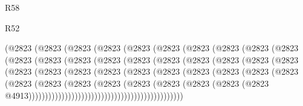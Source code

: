 \begin{lexlean}{R58}
\begin{lexlean}{R52}
\begin{coremodule}
{{{{{{{{{{{{{{{{{{{{{{{{{{{{{{{{{{{{{{{{{{{{{{{{{{{{{{{{{{{{{{{{{{{{{{{{{{{{{{{{{{{{{{{{{{{{{{{{{{{{{{{{{{{{{{{{{{{{{{{{{{{{{{{{{{{{{{{{{{{{{{{{{{{{{{{{{{{{{{{{{{{{{{{{{{{{{{{{{{{{{{{{{{{{{{{{{{{{{{                    (@2823
                      (@2823
                        (@2823
                          (@2823
                            (@2823
                              (@2823
                                (@2823
                                  (@2823
                                    (@2823
                                      (@2823
                                        (@2823
                                          (@2823
                                            (@2823
                                              (@2823
                                                (@2823
                                                  (@2823
                                                    (@2823
                                                      (@2823
                                                        (@2823
                                                          (@2823
                                                            (@2823
                                                              (@2823
                                                                (@2823
                                                                  (@2823
                                                                    (@2823
                                                                      (@2823
                                                                        (@2823
                                                                          (@2823
                                                                            (@2823
                                                                              (@2823
                                                                                (@2823
                                                                                  (@2823
                                                                                    (@2823
                                                                                      (@2823
                                                                                        (@2823
                                                                                          (@2823
                                                                                            (@2823
                                                                                              (@2823
                                                                                                (@2823
                                                                                                  @4913)))))))))))))))))))))))))))))))))))))))))))))))
}}}}}}}}}}}}}}}}}}}}}}}}}}}}}}}}}}}}}}}}}}}}}}}}}}}}}}}}}}}}}}}}}}}}}}}}}}}}}}}}}}}}}}}}}}}}}}}}}}}}}}}}}}}}}}}}}}}}}}}}}}}}}}}}}}}}}}}}}}}}}}}}}}}}}}}}}}}}}}}}}}}}}}}}}}}}}}}}}}}}}}}}}}}}}}}}}}}}}}
\end{coremodule}
\end{lexlean}
\end{lexlean}
